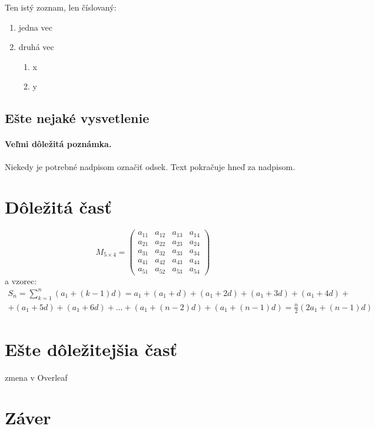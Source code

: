 \documentclass[10pt,twocolumn,twoside,slovak,a4paper]{article}
\begin{document}
Ten istý zoznam, len číslovaný:

\begin{enumerate}
\item jedna vec
\item druhá vec
	\begin{enumerate}
	\item x
	\item y
	\end{enumerate}
\end{enumerate}


\subsection{Ešte nejaké vysvetlenie} \label{ina:este}

\paragraph{Veľmi dôležitá poznámka.}
Niekedy je potrebné nadpisom označiť odsek. Text pokračuje hneď za nadpisom.



\section{Dôležitá časť} \label{dolezita}
\begin{equation}
M_{5\times4} = \begin{pmatrix}
a_{11} & a_{12} & a_{13} & a_{14} \\
a_{21} & a_{22} & a_{23} & a_{24} \\
a_{31} & a_{32} & a_{33} & a_{34} \\
a_{41} & a_{42} & a_{43} & a_{44} \\
a_{51} & a_{52} & a_{53} & a_{54}
\end{pmatrix}
\end{equation}
a vzorec:
\begin{multline}
S_n = \sum_{k=1}^{n} (a_1 + (k-1)d) = a_1 + (a_1 + d) + (a_1 + 2d) + (a_1 + 3d) + (a_1 + 4d) + \\
+ (a_1 + 5d) + (a_1 + 6d) + \dots + (a_1 + (n-2)d) + (a_1 + (n-1)d) = \frac{n}{2}(2a_1 + (n-1)d)
\end{multline}



\section{Ešte dôležitejšia časť} \label{dolezitejsia}
zmena v Overleaf




\section{Záver} \label{zaver} %






\end{document}
